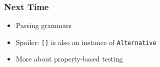 \begin{frame}

\frametitle{Next Time}

\vspace{\fill}

\begin{itemize}

\item Parsing grammars

\item Spoiler: \texttt{[]} is also an instance of \texttt{Alternative}

\item More about property-based testing

\end{itemize}

\vspace{\fill}

\end{frame}
